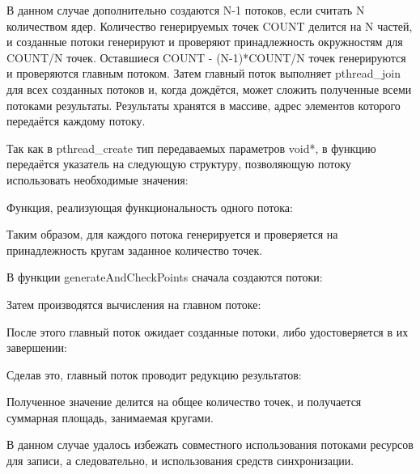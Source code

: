 В данном случае дополнительно создаются N-1 потоков, если считать N количеством ядер. Количество генерируемых точек COUNT делится на N частей, и созданные потоки генерируют и проверяют принадлежность окружностям для COUNT/N точек. Оставшиеся COUNT - (N-1)*COUNT/N точек генерируются и проверяются главным потоком. Затем главный поток выполняет pthread\_join для всех созданных потоков и, когда дождётся, может сложить полученные всеми потоками результаты. Результаты хранятся в массиве, адрес элементов которого передаётся каждому потоку.

Так как в pthread\_create тип передаваемых параметров void*, в функцию передаётся указатель на следующую структуру, позволяющую потоку использовать необходимые значения:




Функция, реализующая функциональность одного потока:



Таким образом, для каждого потока генерируется и проверяется на принадлежность кругам заданное количество точек.

В функции generateAndCheckPoints сначала создаются потоки:



Затем производятся вычисления на главном потоке:



После этого главный поток ожидает созданные потоки, либо удостоверяется в их завершении:



Сделав это, главный поток проводит редукцию результатов:



Полученное значение делится на общее количество точек, и получается суммарная площадь, занимаемая кругами.

В данном случае удалось избежать совместного использования потоками ресурсов для записи, а следовательно, и использования средств синхронизации.

